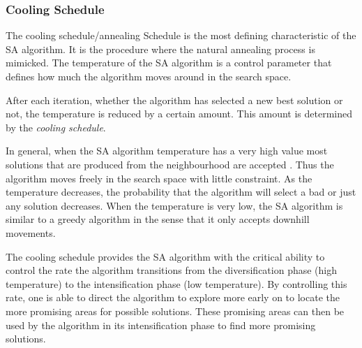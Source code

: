 \subsubsection{Cooling Schedule}
The cooling schedule/annealing Schedule is the most defining characteristic of the \gls{SA} algorithm. It is the procedure where the natural annealing process is mimicked. The temperature of the \gls{SA} algorithm is a control parameter that defines how much the algorithm moves around in the search space.

After each iteration, whether the algorithm has selected a new best solution or not, the temperature is reduced by a certain amount. This amount is determined by the \emph{cooling schedule}.

In general, when the \gls{SA} algorithm temperature has a very high value most solutions that are produced from the neighbourhood are accepted \cite{ClusterSA}. Thus the algorithm moves freely in the search space with little constraint. As the temperature decreases, the probability that the algorithm will select a bad or just any solution decreases\cite{ClusterSA}. When the temperature is very low, the \gls{SA} algorithm is similar to a greedy algorithm in the sense that it only accepts downhill movements\cite{ClusterSA}.

The cooling schedule provides the \gls{SA} algorithm with the critical ability to control the rate the algorithm transitions from the diversification phase (high temperature) to the intensification phase (low temperature)\cite{ClusterSA}. By controlling this rate, one is able to direct the algorithm to explore more early on to locate the more promising areas for possible solutions. These promising areas can then be used by the algorithm in its intensification phase to find more promising solutions.

